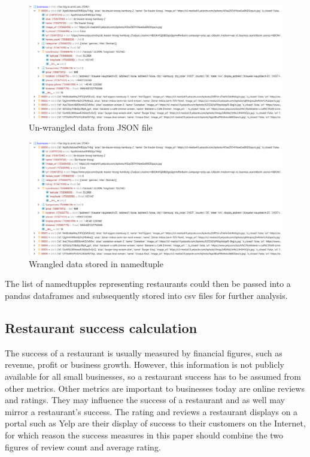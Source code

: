 \documentclass[a4paper, 11pt, oneside]{Thesis}  %
\begin{document}
\begin{figure}[h]
\includegraphics[scale=0.4]{Figures/restaurants_unwrangled.png}
\centering
\caption{Un-wrangled data from JSON file}
\label{fig:un-wrangled data from JSON file}
\end{figure}

\begin{figure}[h]
\includegraphics[scale=0.4]{Figures/restaurants_unwrangled.png}
\centering
\caption{Wrangled data stored in namedtuple}
\label{fig:wranged data stored in namedtuple}
\end{figure}

The list of namedtupples representing restaurants could then be passed into a pandas dataframes and subsequently stored into \ac{csv} files for further analysis.


\subsection{Restaurant success calculation}

The success of a restaurant is usually measured by financial figures, such as revenue, profit or business growth. However, this information is not publicly available for all small businesses, so a restaurant success has to be assumed from other metrics. Other metrics are important to businesses today are online reviews and ratings. They may influence the success of a restaurant and as well may mirror a restaurant's success. The rating and reviews a restaurant displays on a portal such as Yelp are their display of success to their customers on the Internet, for which reason the success measures in this paper should combine the two figures of review count and average rating.
\end{document}
